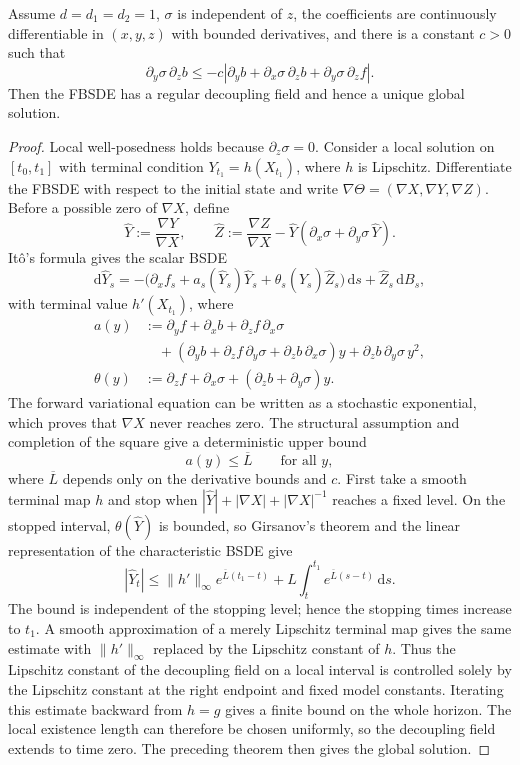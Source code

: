 \begin{thm}\label{fbsdeDF}
Assume $d=d_1=d_2=1$, $\sigma$ is independent of $z$, the coefficients
are continuously differentiable in $(x,y,z)$ with bounded derivatives,
and there is a constant $c>0$ such that
\[
  \partial_y\sigma\,\partial_zb
  \le-c\left|
    \partial_yb
    +\partial_x\sigma\,\partial_zb
    +\partial_y\sigma\,\partial_zf
  \right|.
\]
Then the FBSDE has a regular decoupling field and hence a unique global
solution.
\end{thm}

\begin{proof}
Local well-posedness holds because $\partial_z\sigma=0$.  Consider a
local solution on $[t_0,t_1]$ with terminal condition
$Y_{t_1}=h(X_{t_1})$, where $h$ is Lipschitz.  Differentiate the FBSDE
with respect to the initial state and write
$\nabla\Theta=(\nabla X,\nabla Y,\nabla Z)$.  Before a possible zero of
$\nabla X$, define
\[
  \widehat Y:=\frac{\nabla Y}{\nabla X},
  \qquad
  \widehat Z:=\frac{\nabla Z}{\nabla X}
    -\widehat Y(\partial_x\sigma+\partial_y\sigma\,\widehat Y).
\]
It\^o's formula gives the scalar BSDE
\[
  \mathrm d\widehat Y_s
  =-\bigl(
    \partial_xf_s+a_s(\widehat Y_s)\widehat Y_s
    +\theta_s(\widehat Y_s)\widehat Z_s
  \bigr)\,\mathrm ds
  +\widehat Z_s\,\mathrm dB_s,
\]
with terminal value $h'(X_{t_1})$, where
\[
\begin{aligned}
  a(y)
  &:=\partial_yf+\partial_xb+\partial_zf\,\partial_x\sigma\\
  &\quad+
    (\partial_yb+\partial_zf\,\partial_y\sigma
      +\partial_zb\,\partial_x\sigma)y
    +\partial_zb\,\partial_y\sigma\,y^2,\\
  \theta(y)
  &:=\partial_zf+\partial_x\sigma
    +(\partial_zb+\partial_y\sigma)y.
\end{aligned}
\]
The forward variational equation can be written as a stochastic
exponential, which proves that $\nabla X$ never reaches zero.  The
structural assumption and completion of the square give a deterministic
upper bound
\[
  a(y)\le\overline L
  \qquad\text{for all }y,
\]
where $\overline L$ depends only on the derivative bounds and $c$.
First take a smooth terminal map $h$ and stop when
$|\widehat Y|+|\nabla X|+|\nabla X|^{-1}$ reaches a fixed level.  On the
stopped interval, $\theta(\widehat Y)$ is bounded, so Girsanov's theorem
and the linear representation of the characteristic BSDE give
\[
  |\widehat Y_t|
  \le \|h'\|_\infty e^{\overline L(t_1-t)}
      +L\int_t^{t_1}e^{\overline L(s-t)}\,\mathrm ds.
\]
The bound is independent of the stopping level; hence the stopping times
increase to $t_1$.  A smooth approximation of a merely Lipschitz terminal
map gives the same estimate with $\|h'\|_\infty$ replaced by the
Lipschitz constant of $h$.
Thus the Lipschitz constant of the decoupling field on a local interval
is controlled solely by the Lipschitz constant at the right endpoint and
fixed model constants.  Iterating this estimate backward from
$h=g$ gives a finite bound on the whole horizon.  The local existence
length can therefore be chosen uniformly, so the decoupling field
extends to time zero.  The preceding theorem then gives the global
solution.
\end{proof}

